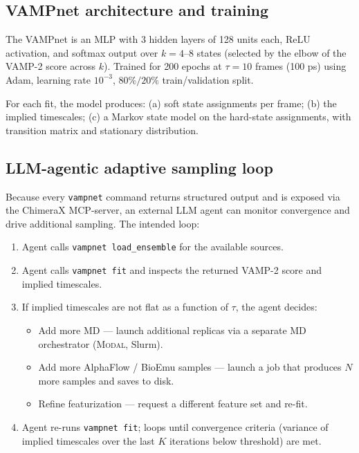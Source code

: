 \documentclass[11pt]{article}
\begin{document}
\subsection{VAMPnet architecture and training}

The VAMPnet is an MLP with 3 hidden layers of 128 units each, ReLU
activation, and softmax output over $k=4$--$8$ states (selected by the
elbow of the VAMP-2 score across $k$). Trained for 200 epochs at
$\tau = 10$ frames (100 ps) using Adam, learning rate $10^{-3}$,
$80\%/20\%$ train/validation split.

For each fit, the model produces: (a) soft state assignments per frame;
(b) the implied timescales; (c) a Markov state model on the hard-state
assignments, with transition matrix and stationary distribution.

\subsection{LLM-agentic adaptive sampling loop}

Because every \texttt{vampnet} command returns structured output and is
exposed via the ChimeraX MCP-server, an external LLM agent can monitor
convergence and drive additional sampling. The intended loop:

\begin{enumerate}[leftmargin=*,itemsep=2pt]
  \item Agent calls \texttt{vampnet load\_ensemble} for the available
        sources.
  \item Agent calls \texttt{vampnet fit} and inspects the returned
        VAMP-2 score and implied timescales.
  \item If implied timescales are not flat as a function of $\tau$,
        the agent decides:
        \begin{itemize}[itemsep=1pt]
          \item Add more MD --- launch additional replicas via a
                separate MD orchestrator (\textsc{Modal}, Slurm).
          \item Add more AlphaFlow / BioEmu samples --- launch a job
                that produces $N$ more samples and saves to disk.
          \item Refine featurization --- request a different feature
                set and re-fit.
        \end{itemize}
  \item Agent re-runs \texttt{vampnet fit}; loops until convergence
        criteria (variance of implied timescales over the last $K$
        iterations below threshold) are met.
\end{enumerate}
\end{document}
